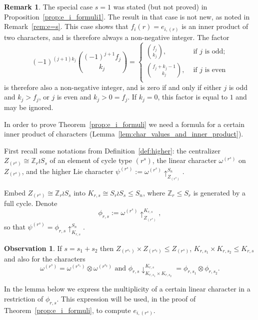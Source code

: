\documentclass[10pt]{article}
\theoremstyle{definition}
\newtheorem{remark}[theorem]{Remark}
\def\ZZ{{\mathbb Z}}
\newtheorem{observation}[cdrthm]{Observation}
\begin{document}
\begin{remark}\label{rem:when_factor_is_zero}
    The special case $s=1$ was stated (but not proved) in  Proposition~\ref{prop:e_i_formuli1}.
    The result in that case is not new, as noted in Remark~\ref{rem:e=s}. 
    This case
    shows that $f_i(r) = e_{i,(r)}$ is an inner product of two characters, and is therefore always a non-negative integer. The factor
    \[
        (-1)^{(j+1)k_j} \binom{(-1)^{j+1} f_j}{k_j}
        = \begin{cases}
            \binom{f_j}{k_j}, &\text{ if } j \text{ is odd;}\\
            \binom{f_j+k_j-1}{k_j}, &\text{ if } j \text{ is even}\\
        \end{cases}
    \]
    is therefore also a non-negative integer,
    and is zero if and only if 
    either $j$ is odd and $k_j > f_j$,
    or $j$ is even and $k_j > 0 = f_j$.
    If $k_j = 0$, this factor is equal to $1$ and may be ignored.
\end{remark}
    
In order to prove Theorem~\ref{prop:e_i_formuli} we need a formula for a certain inner product of characters (Lemma~\ref{lem:char_values_and_inner_product}).

First recall some notations from Definition~\ref{def:higher}:
the centralizer $Z_{(r^s)} \cong \ZZ_r \wr S_s$ of an element of cycle type $(r^s)$,
the linear character $\omega^{(r^s)}$ on $Z_{(r^s)}$, 
and the higher Lie character
$\psi^{(r^s)} := \omega^{(r^s)}\uparrow_{Z_{(r^s)}}^{S_n}$. 

Embed $Z_{(r^s)} \cong \ZZ_r \wr S_s$ into 
$K_{r,s} \cong S_r \wr S_s \le S_n$, 
where $\ZZ_r \le S_r$ is generated by a full cycle.
Denote 
\[
    \phi_{r,s} := \omega^{(r^s)}\uparrow_{Z_{(r^s)}}^{K_{r,s}},
\]
so that $\psi^{(r^s)} = \phi_{r,s}\uparrow_{K_{r,s}}^{S_n}$. 
\begin{observation}\label{obs:phi_product} 
    If $s=s_1+s_2$ then $Z_{(r^{s_1})}\times Z_{(r^{s_2})}\leq Z_{(r^s)}$, $K_{r,s_1}\times K_{r,s_2}\leq K_{r,s}$ and also for the characters
    \[ 
        \omega^{(r^s)}
        = \omega^{(r^{s_1})}\otimes\omega^{(r^{s_2})}\text{ and }  \phi_{r,s}\downarrow^{K_{r,s}}_{K_{r,s_1}\times K_{r,s_2}}=\phi_{r,s_1}\otimes\phi_{r,s_2}.
    \]
\end{observation}

In the lemma below we express the multiplicity of a certain linear character in a restriction of $\phi_{r,s}$.
This expression will be used, in the proof of Theorem~\ref{prop:e_i_formuli}, to compute $e_{i,(r^s)}$.
	
\end{document}

